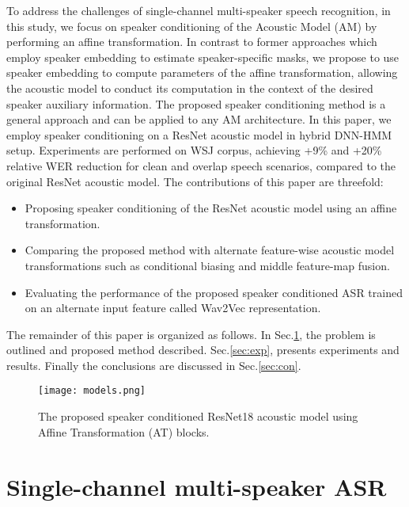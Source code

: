 \documentclass{article}
\begin{document}
To address the challenges of single-channel multi-speaker speech recognition, in this study, we focus on speaker conditioning of the Acoustic Model (AM) by performing an affine transformation.
In contrast to former approaches which employ speaker embedding to estimate speaker-specific masks, we propose to use speaker embedding to compute parameters of the affine transformation, allowing the acoustic model to conduct its computation in the context of the desired speaker auxiliary information. The proposed speaker conditioning method is a general approach and can be applied to any AM architecture. In this paper, we employ  speaker conditioning on a ResNet acoustic model in hybrid DNN-HMM setup. Experiments are performed on WSJ corpus, achieving +9\% and +20\% relative WER reduction for clean and overlap speech scenarios, compared to the original ResNet acoustic model. The contributions of this paper are threefold:
\begin{itemize}
    \item Proposing speaker conditioning of the ResNet acoustic model using an affine transformation.
    \item Comparing the proposed method with alternate feature-wise  acoustic model transformations such as conditional biasing and middle feature-map fusion.
    \item Evaluating the performance of the proposed speaker conditioned ASR trained on an alternate input feature called Wav2Vec representation. 
\end{itemize}


The remainder of this paper is organized as follows. In Sec.\ref{sec:sys}, the problem is outlined and proposed method described. Sec.\ref{sec:exp}, presents experiments and results. Finally the conclusions are discussed in Sec.\ref{sec:con}. 

\begin{figure*}[t]
\centering
\vspace{-0.9cm}
\texttt{[image: models.png]}
\vspace{-0.7cm}
\caption{The proposed speaker conditioned ResNet18 acoustic model using Affine Transformation (AT) blocks.}
\label{fig:model}
\vspace{-0.2cm}
\end{figure*}


\section{Single-channel multi-speaker ASR}
\label{sec:sys}
\end{document}
